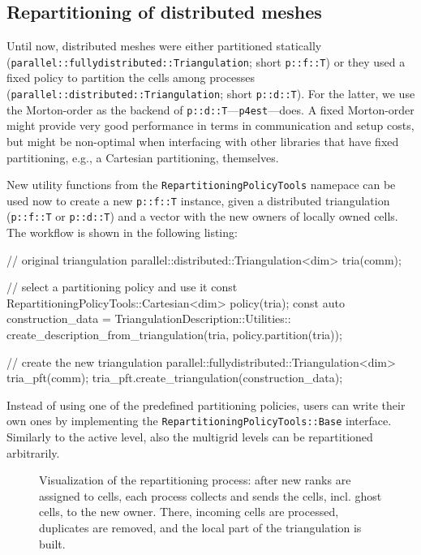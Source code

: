 \documentclass{ansarticle-preprint}
\begin{document}
\subsection{Repartitioning of distributed meshes}\label{sec:repartitioning}

Until now, distributed meshes were either partitioned statically (\texttt{parallel::\allowbreak fullydistributed::\allowbreak Triangulation}; short \texttt{p::f::T}) or they used a
fixed policy to partition the cells among processes
(\texttt{parallel::\allowbreak distributed::\allowbreak Triangulation}; short \texttt{p::d::T}). For the latter, we
use the Morton-order as the backend of \texttt{p::d::T}---\texttt{p4est}---does. A fixed Morton-order
might provide very good performance in terms in communication and
setup costs, but might be non-optimal when interfacing with other
libraries that have fixed partitioning, e.g., a Cartesian
partitioning, themselves.

New utility functions from the \texttt{RepartitioningPolicyTools} namepace can be
used now to create a new \texttt{p::f::T} instance,
given a distributed triangulation (\texttt{p::f::T} or \texttt{p::d::T}) and a vector with the new owners of locally
owned cells. The workflow is shown in the following listing:
\begin{c++}
// original triangulation
parallel::distributed::Triangulation<dim> tria(comm);

// select a partitioning policy and use it
const RepartitioningPolicyTools::Cartesian<dim> policy(tria);
const auto construction_data = TriangulationDescription::Utilities::
  create_description_from_triangulation(tria, policy.partition(tria));

// create the new triangulation
parallel::fullydistributed::Triangulation<dim> tria_pft(comm);
tria_pft.create_triangulation(construction_data);
\end{c++}
Instead of using one of the predefined partitioning policies, users
can write their own ones by implementing the \texttt{RepartitioningPolicyTools::Base} interface. Similarly to the
active level, also the multigrid levels can be repartitioned arbitrarily.

\begin{figure}
    \centering
    \def\svgwidth{0.8\columnwidth}
    
    \caption{Visualization of the repartitioning process: after new ranks 
    are assigned to cells, each process collects and sends the cells, incl. 
    ghost cells, to the new owner. There, incoming cells are processed, duplicates
    are removed, and the local part of the triangulation is built.}\label{fig:repartitioning}
\end{figure}
\end{document}
